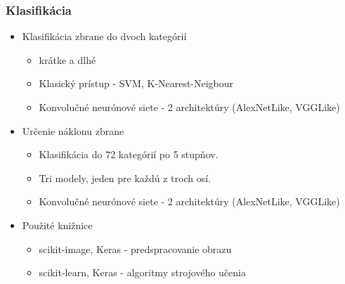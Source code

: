 \documentclass[10pt,xcolor=pdflatex]{beamer}
\begin{document}
\begin{frame}\frametitle{Klasifikácia}
    \begin{itemize}
        \item Klasifikácia zbrane do dvoch kategórií
        \begin{itemize}
            \item krátke a dlhé
            \vspace{0.2cm}
            \item Klasický prístup - SVM, K-Nearest-Neigbour
            \item Konvolučné neurónové siete - 2 architektúry (AlexNetLike, VGGLike)
        \end{itemize}

        \vspace{0.1cm}

        \item Určenie náklonu zbrane
        \begin{itemize}
            \item Klasifikácia do 72 kategórií po 5 stupňov.
            \item Tri modely, jeden pre každú z troch osí.
            \vspace{0.2cm}
            \item Konvolučné neurónové siete - 2 architektúry (AlexNetLike, VGGLike)
        \end{itemize}

        \vspace{0.3cm}

        \item Použité knižnice
        \begin{itemize}
            \item scikit-image, Keras - predspracovanie obrazu
            \item scikit-learn, Keras - algoritmy strojového učenia
        \end{itemize}

    \end{itemize}
\end{frame}

\end{document}
